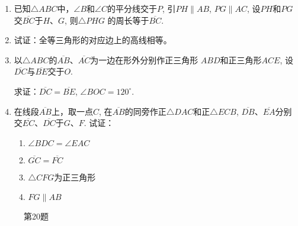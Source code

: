 \begin{enumerate}
\item 已知$\triangle ABC$中，$\angle B$和$\angle C$的平分线交于$P$, 引$PH\parallel
AB$, $PG\parallel AC$, 设$PH$和$PG$交$\overline{BC}$于$H$、$G$, 则$\triangle PHG$
的周长等于$\overline{BC}$.
\item 试证：全等三角形的对应边上的高线相等。
\item 以$\triangle ABC$的$\overline{AB}$、$\overline{AC}$为一边在形外分别作正三角形
$ABD$和正三角形$ACE$, 设$\overline{DC}$与$\overline{BE}$交于$O$.

求证：$\overline{DC}=\overline{BE}$, $\angle BOC=120^{\circ}$.
\item 在线段$\overline{AB}$上，取一点$C$, 在$\overline{AB}$的同旁作正$\triangle DAC$和正$\triangle ECB$, $\overline{DB}$、$\overline{EA}$分别交$\overline{EC}$、$\overline{DC}$于$G$、$F$.
试证：
\begin{enumerate}
    \item $\angle BDC=\angle EAC$
    \item $\overline{GC}=\overline{FC}$
    \item $\triangle CFG$为正三角形
    \item $FG\parallel AB$
\end{enumerate}
\end{enumerate}

\begin{figure}[htp]\centering
    \begin{minipage}[t]{0.48\textwidth}
    \centering
{}
    \caption*{第20题}
    \end{minipage}
    \begin{minipage}[t]{0.48\textwidth}
    \centering
    \caption{}
    \end{minipage}
    \end{figure}


